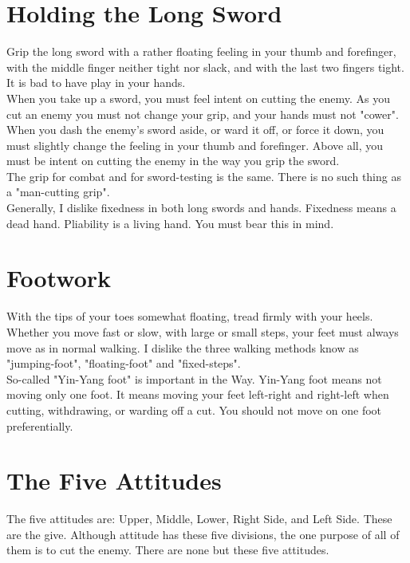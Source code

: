 \section{Holding the Long Sword}

Grip the long sword with a rather floating feeling in your thumb and forefinger, with the middle finger neither tight nor slack, and with the last two fingers tight. It is bad to have play in your hands.\\

When you take up a sword, you must feel intent on cutting the enemy. As you cut an enemy you must not change your grip, and your hands must not "cower". When you dash the enemy's sword aside, or ward it off, or force it down, you must slightly change the feeling in your thumb and forefinger. Above all, you must be intent on cutting the enemy in the way you grip the sword.\\

The grip for combat and for sword-testing is the same. There is no such thing as a "man-cutting grip".\\

Generally, I dislike fixedness in both long swords and hands. Fixedness means a dead hand. Pliability is a living hand. You must bear this in mind.\\
\section{Footwork}

With the tips of your toes somewhat floating, tread firmly with your heels. Whether you move fast or slow, with large or small steps, your feet must always move as in normal walking. I dislike the three walking methods know as "jumping-foot", "floating-foot" and "fixed-steps".\\

So-called "Yin-Yang foot" is important in the Way. Yin-Yang foot means not moving only one foot. It means moving your feet left-right and right-left when cutting, withdrawing, or warding off a cut. You should not move on one foot preferentially.\\
\section{The Five Attitudes}

The five attitudes are: Upper, Middle, Lower, Right Side, and Left Side. These are the give. Although attitude has these five divisions, the one purpose of all of them is to cut the enemy. There are none but these five attitudes.\\

